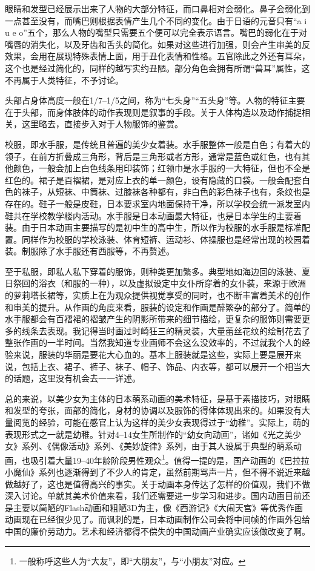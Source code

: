 \documentclass[cs5size,b5paper,nofonts]{ctexart}
\begin{document}
\begin{multicols}{2}
眼睛和发型已经展示出来了人物的大部分特征，而口鼻相对会弱化。鼻子会弱化到一点甚至没有，而嘴巴则根据表情产生几个不同的变化。由于日语的元音只有“a i u e o”五个，那么人物的嘴型只需要五个便可以完全表示语言。嘴巴的弱化在于对嘴唇的消失化，以及牙齿和舌头的简化。如果对这些进行加强，则会产生审美的反效果，会用在展现特殊表情上面，用于丑化表情和性格。五官除此之外还有耳朵，这个也是经过简化的，同样的越写实约丑陋。部分角色会拥有所谓“兽耳”属性，这不再属于人类特征，不予讨论。

头部占身体高度一般在1/7--1/5之间，称为“七头身”“五头身”等。人物的特征主要在于头部，而身体肢体的动作表现则是叙事的手段。关于人体构造以及动作捕捉相关，这里略去，直接步入对于人物服饰的鉴赏。

校服，即水手服，是传统且普遍的美少女着装。水手服整体一般是白色；有着大的领子，在前方折叠成三角形，背后是三角形或者方形，通常是蓝色或红色，也有其他颜色，一般会加上白色线条用印装饰；红领巾是水手服的一大特征，但也不全是红色的。裙子是百褶裙，是对应上衣的单一颜色，设有隐藏的口袋。一般会配套白色的袜子，从短袜、中筒袜、过膝袜各种都有，非白色的彩色袜子也有，条纹也是存在的。鞋子一般是皮鞋，日本要求室内地面保持干净，所以学校会统一派发室内鞋共在学校教学楼内活动。水手服是日本动画最大特征，也是日本学生的主要着装。由于日本动画主要描写的是初中生的高中生，所以作为校服的水手服是标准配置。同样作为校服的学校泳装、体育短裤、运动衫、体操服也是经常出现的校园着装。制服除了水手服还有西服等，不再赘述。

至于私服，即私人私下穿着的服饰，则种类更加繁多。典型地如海边回的泳装、夏日祭回的浴衣（和服的一种），以及虚拟设定中女仆所穿着的女仆装，来源于欧洲的萝莉塔长裙等，实质上在为观众提供视觉享受的同时，也不断丰富着美术的创作和审美的提升。从作画的角度来看，服装的设定和作画是醉繁杂的部分了。简单的水手服都会有百褶裙的褶皱产生的阴影所带来的细节描绘，更复杂的服饰则需要更多的线条去表现。我记得当时画过时崎狂三的精灵装，大量蕾丝花纹的绘制花去了整张作画的一半时间。当然我知道专业画师不会这么没效率的，不过就我个人的经验来说，服装的华丽是要花大心血的。基本上服装就是这些，实际上要是展开来说，包括上衣、裙子、裤子、袜子、帽子、饰品、内衣等，都可以展开一个相当大的话题，这里没有机会去一一详述。

\smallskip

总的来说，以美少女为主体的日本萌系动画的美术特征，是基于素描技巧，对眼睛和发型的夸张，面部的简化，身材的协调以及服饰的得体体现出来的。如果没有大量阅览的经验，可能在感官上认为这样的美少女表现得过于“幼稚”。实际上，萌的表现形式之一就是幼稚。针对4--14女生所制作的“幼女向动画”，诸如《光之美少女》系列、《偶像活动》系列、《美妙旋律》系列，由于其人设属于典型的萌系动画，也吸引着大量19--40年龄阶段男性观众\footnote{一般称呼这些人为“大友”，即“大朋友”，与“小朋友”对应。}。值得一提的是，国产动画的《巴拉拉小魔仙》系列也逐渐得到了不少人的肯定，虽然前期骂声一片，但不得不说近来越做越好了，这也是值得高兴的事实。关于动画本身传达了怎样的价值观，我们不做深入讨论。单就其美术价值来看，我们还需要进一步学习和进步。国内动画目前还是主要以简陋的Flash动画和粗陋3D为主，像《西游记》《大闹天宫》等优秀作画动画现在已经很少见了。而讽刺的是，日本动画制作公司会将中间帧的作画外包给中国的廉价劳动力。艺术和经济都得不偿失的中国动画产业确实应该做改变了啊。


\end{multicols}
\end{document}
